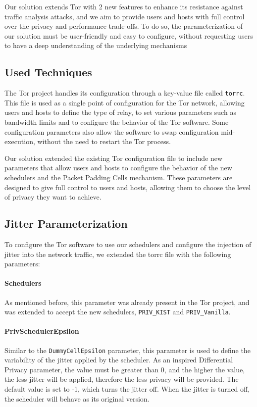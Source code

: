 Our solution extends Tor with 2 new features to enhance its resistance against traffic analysis attacks, and we aim to provide users and hosts with full control over the privacy and performance trade-offs. To do so, the parameterization of our solution must be user-friendly and easy to configure, without requesting users to have a deep understanding of the underlying mechanisms 


\subsection{Used Techniques}\label{sec:used_techniques}

The Tor project handles its configuration through a key-value file called \texttt{torrc}. This file is used as a single point of configuration for the Tor network, allowing users and hosts to define the type of relay, to set various parameters such as bandwidth limits and to configure the behavior of the Tor software. Some configuration parameters also allow the software to swap configuration mid-execution, without the need to restart the Tor process.

Our solution extended the existing Tor configuration file to include new parameters that allow users and hosts to configure the behavior of the new schedulers and the Packet Padding Cells mechanism. These parameters are designed to give full control to users and hosts, allowing them to choose the level of privacy they want to achieve.


\subsection{Jitter Parameterization}\label{sec:jitter_parameterization}

To configure the Tor software to use our schedulers and configure the injection of jitter into the network traffic, we extended the torrc file with the following parameters: 

\paragraph{Schedulers} As mentioned before, this parameter was already present in the Tor project, and was extended to accept the new schedulers, \texttt{PRIV\_KIST} and \texttt{PRIV\_Vanilla}. 

\paragraph{PrivSchedulerEpsilon} Similar to the \texttt{DummyCellEpsilon} parameter, this parameter is used to define the variability of the jitter applied by the scheduler. As an inspired Differential Privacy parameter, the value must be greater than 0, and the higher the value, the less jitter will be applied, therefore the less privacy will be provided. The default value is set to -1, which turns the jitter off. When the jitter is turned off, the scheduler will behave as its original version.  

